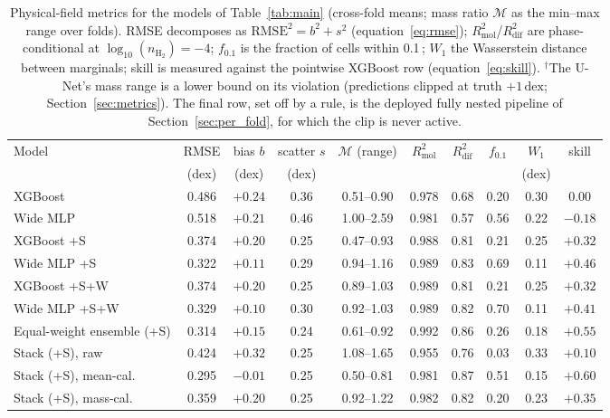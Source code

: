 \documentclass[fleqn,usenatbib]{rasti}
\newcommand{\logn}{\log_{10}(n_{\mathrm{H_2}})}
\newcommand{\dex}{\,\text{dex}}
\newcommand{\Rsq}{R^2}
\newcommand{\Mratio}{\mathcal{M}}
\begin{document}
\begin{table}
\centering
\caption{Physical-field metrics for the models of Table~\ref{tab:main}
(cross-fold means; mass ratio \(\Mratio\) as the min--max range over
folds). RMSE decomposes as \(\mathrm{RMSE}^2 = b^2 + s^2\)
(equation~\ref{eq:rmse}); \(\Rsq_{\mathrm{mol}}\)/\(\Rsq_{\mathrm{dif}}\)
are phase-conditional at \(\logn = -4\); \(f_{0.1}\) is the fraction of
cells within 0.1\dex; \(W_1\) the Wasserstein distance between marginals;
skill is measured against the pointwise XGBoost row
(equation~\ref{eq:skill}). \(^\dagger\)The U-Net's mass range is a lower
bound on its violation (predictions clipped at truth \(+1\dex\);
Section~\ref{sec:metrics}).
The final row, set off by a rule, is the deployed fully nested pipeline
of Section~\ref{sec:per_fold}, for which the clip is never active.}
\label{tab:summary}
\begin{tabular}{lccccccccc}
\hline
Model & RMSE & bias \(b\) & scatter \(s\) & \(\Mratio\) (range) &
  \(\Rsq_{\mathrm{mol}}\) & \(\Rsq_{\mathrm{dif}}\) & \(f_{0.1}\) & \(W_1\) & skill \\
 & (dex) & (dex) & (dex) & & & & & (dex) & \\
\hline
XGBoost                    & 0.486 & \(+0.24\) & 0.36 & 0.51--0.90 & 0.978 & 0.68 & 0.20 & 0.30 & \(0.00\) \\
Wide MLP                   & 0.518 & \(+0.21\) & 0.46 & 1.00--2.59 & 0.981 & 0.57 & 0.56 & 0.22 & \(-0.18\) \\
XGBoost +S                 & 0.374 & \(+0.20\) & 0.25 & 0.47--0.93 & 0.988 & 0.81 & 0.21 & 0.25 & \(+0.32\) \\
Wide MLP +S                & 0.322 & \(+0.11\) & 0.29 & 0.94--1.16 & 0.989 & 0.83 & 0.69 & 0.11 & \(+0.46\) \\
XGBoost +S+W               & 0.374 & \(+0.20\) & 0.25 & 0.89--1.03 & 0.989 & 0.81 & 0.21 & 0.25 & \(+0.32\) \\
Wide MLP +S+W              & 0.329 & \(+0.10\) & 0.30 & 0.92--1.03 & 0.989 & 0.82 & 0.70 & 0.11 & \(+0.41\) \\
Equal-weight ensemble (+S) & 0.314 & \(+0.15\) & 0.24 & 0.61--0.92 & 0.992 & 0.86 & 0.26 & 0.18 & \(+0.55\) \\
Stack (+S), raw            & 0.424 & \(+0.32\) & 0.25 & 1.08--1.65 & 0.955 & 0.76 & 0.03 & 0.33 & \(+0.10\) \\
Stack (+S), mean-cal.      & 0.295 & \(-0.01\) & 0.25 & 0.50--0.81 & 0.981 & 0.87 & 0.51 & 0.15 & \(+0.60\) \\
Stack (+S), mass-cal.      & 0.359 & \(+0.20\) & 0.25 & 0.92--1.22 & 0.982 & 0.82 & 0.20 & 0.23 & \(+0.35\) \\

\end{tabular}
\end{table}
\end{document}
